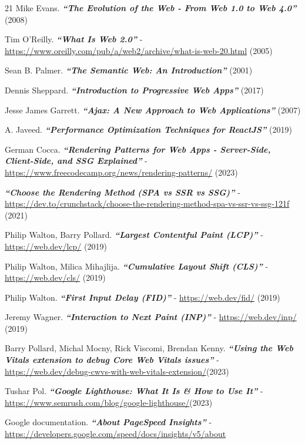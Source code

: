 \documentclass[12pt, a4paper]{report}
\begin{document}
\begin{thebibliography} {21}
	 Mike Evans. \textbf{\textit{“The Evolution of the Web - From Web 1.0 to Web 4.0”}} (2008)
	
	Tim O'Reilly. \textbf{\textit{“What Is Web 2.0”}} - \url{https://www.oreilly.com/pub/a/web2/archive/what-is-web-20.html} (2005)
	
	Sean B. Palmer. \textbf{\textit{“The Semantic Web: An Introduction”}} (2001)
	
	Dennis Sheppard. \textbf{\textit{“Introduction to Progressive Web Apps”}} (2017)

	Jesse James Garrett. \textbf{\textit{“Ajax: A New Approach to Web Applications”}} (2007)

	A. Javeed. \textbf{\textit{“Performance Optimization Techniques for ReactJS”}} (2019)

	German Cocca. \textbf{\textit{“Rendering Patterns for Web Apps - Server-Side, Client-Side, and SSG Explained”}} - \url{https://www.freecodecamp.org/news/rendering-patterns/} (2023)
	
	\textbf{\textit{“Choose the Rendering Method (SPA vs SSR vs SSG)”}} - \url{https://dev.to/crunchstack/choose-the-rendering-method-spa-vs-ssr-vs-ssg-121f} (2021)
	
	Philip Walton, Barry Pollard. \textbf{\textit{“Largest Contentful Paint (LCP)”}} - \url{https://web.dev/lcp/} (2019)
	
	Philip Walton, Milica Mihajlija. \textbf{\textit{“Cumulative Layout Shift (CLS)”}} - \url{https://web.dev/cls/} (2019)
	
	Philip Walton. \textbf{\textit{“First Input Delay (FID)”}} - \url{https://web.dev/fid/} (2019)

	Jeremy Wagner. \textbf{\textit{“Interaction to Next Paint (INP)”}} - \url{https://web.dev/inp/} (2019)

	Barry Pollard, Michal Mocny, Rick Viscomi, Brendan Kenny. \textbf{\textit{“Using the Web Vitals extension to debug Core Web Vitals issues”}} - \url{https://web.dev/debug-cwvs-with-web-vitals-extension/}(2023)
	
	Tushar Pol. \textbf{\textit{“Google Lighthouse: What It Is \& How to Use It”}} - \url{https://www.semrush.com/blog/google-lighthouse/}(2023)
	
	Google documentation. \textbf{\textit{“About PageSpeed Insights”}} - \url{https://developers.google.com/speed/docs/insights/v5/about}
	

\end{thebibliography}
\end{document}
